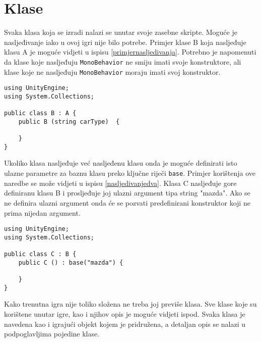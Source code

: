 \section{Klase}
Svaka klasa koja se izradi nalazi se unutar svoje zasebne skripte. Moguće je nasljeđivanje iako u ovoj igri nije bilo potrebe. Primjer klase B koja nasljeđuje klasu A je moguće vidjeti u ispisu \ref{primjernasljedivanja}. Potrebno je napomenuti da klase koje nasljeđuju \texttt{MonoBehavior} ne smiju imati svoje konstruktore, ali klase koje ne nasljeđuju \texttt{MonoBehavior} moraju imati svoj konstruktor. 
\begin{lstlisting}[caption={Primjer nasljeđivanja}, label=primjernasljedivanja]
using UnityEngine;
using System.Collections;

public class B : A {
	public B (string carType)  {
	
	}	
}
\end{lstlisting}
Ukoliko klasa nasljeđuje već nasljeđenu klasu onda je moguće definirati isto ulazne parametre za baznu klasu preko ključne riječi \texttt{base}. Primjer korištenja ove naredbe se može vidjeti u ispisu \ref{nasljedivanjedva}. Klasa C nasljeđuje gore definiranu klasu B i prosljeđuje joj ulazni argument tipa string "mazda". Ako se ne definira ulazni argument onda će se pozvati predefinirani konstruktor koji ne prima nijedan argument.

\begin{lstlisting}[caption={Primjer nasljeđivanja nasljeđene klase}, label=nasljedivanjedva]
using UnityEngine;
using System.Collections;

public class C : B {
	public C () : base("mazda") {
	
	}	
}
\end{lstlisting}

Kako trenutna igra nije toliko složena ne treba joj previše klasa. Sve klase koje su korištene unutar igre, kao i njihov opis je moguće vidjeti ispod. Svaka klasa je navedena kao i igrajući objekt kojem je pridružena, a detaljan opis se nalazi u podpoglavljima pojedine klase.
\newpage

